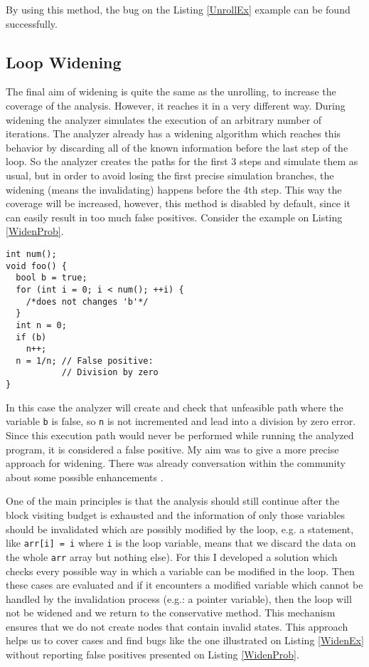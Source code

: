 By using this method, the bug on the Listing \ref{UnrollEx} example can be 
found successfully.

\subsection{Loop Widening}
The final aim of widening is quite the same as the unrolling, to increase 
the coverage of the analysis. However, it reaches it in a very different way. 
During widening the analyzer simulates the execution of an arbitrary number 
of iterations. The analyzer already has a widening algorithm which reaches 
this behavior by discarding all of the known information before the last step 
of the loop. So the analyzer creates the paths for the first 3 steps and 
simulate them as usual, but in order to avoid losing the first precise simulation branches, the widening (means the invalidating) happens 
before the 4th step. 
This way the coverage will be increased, however, this method is disabled by 
default, since it can easily result in too much false positives. Consider the 
example on Listing \ref{WidenProb}.
\\

\begin{lstlisting}
int num();
void foo() {
  bool b = true;
  for (int i = 0; i < num(); ++i) {
    /*does not changes 'b'*/
  }
  int n = 0;
  if (b)
    n++;
  n = 1/n; // False positive:
           // Division by zero
}\end{lstlisting}
In this case the analyzer will create and check that unfeasible path where 
the variable \texttt{b} is false, so \texttt{n} is not incremented and lead 
into a division by zero error. Since this execution path would never be 
performed while running the analyzed program, it is considered a false positive. My aim 
was to give a more precise approach for widening. There was already conversation within the community about some possible enhancements \cite{Widening}.

One of the main principles is that the analysis should still continue after the block 
visiting budget is exhausted and the information of only those variables should be invalidated which are possibly modified by the loop, e.g. a statement, like \texttt{arr[i] = i} where \texttt{i} is the loop variable, means that we discard the data on the whole \texttt{arr} array but nothing else).
For this I developed a solution which checks every possible way in which a 
variable can be modified in the loop. Then these cases are evaluated and if it 
encounters a modified variable which cannot be handled by the invalidation 
process (e.g.: a pointer variable), then the loop will not be widened and we
return to the conservative method. This mechanism ensures that we do not create 
nodes that contain invalid states.
This approach helps us to cover cases and find bugs like the one illustrated on 
Listing \ref{WidenEx} without reporting false positives  
presented on Listing \ref{WidenProb}.


